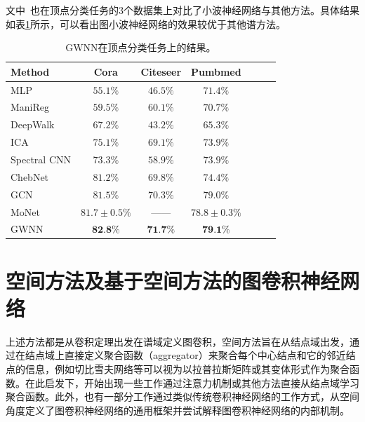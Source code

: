 \documentclass[final]{cvpr}
\begin{document}
文中~\cite{xu2018graph}也在顶点分类任务的3个数据集上对比了小波神经网络与其他方法。具体结果如表\ref{tab:GWNN-bench}所示，可以看出图小波神经网络的效果较优于其他谱方法。
\begin{table}[htb!]
    \centering
    \begin{tabular}{lcccccc} 
    \toprule
        \textbf{Method}  &  \textbf{Cora}   &  \textbf{Citeseer}  &   \textbf{Pumbmed} \\ 
    \midrule
        MLP & $55.1\%$   & $46.5\%$  & $71.4\%$ \\ 
        ManiReg & $59.5\%$   & $60.1\%$  & $70.7\%$ \\
        DeepWalk & $67.2\%$   & $43.2\%$  & $65.3\%$ \\
        ICA & $75.1\%$   & $69.1\%$  & $73.9\%$ \\
    \midrule
        Spectral CNN & $73.3\%$   & $58.9\%$  & $73.9\%$ \\ 
        ChebNet & $81.2\%$   & $69.8\%$  & $74.4\%$ \\ 
        GCN & $81.5\%$   & $70.3\%$  & $79.0\%$ \\ 
        MoNet & $81.7\pm 0.5 \%$   & $——$  & $78.8\pm 0.3 \%$ \\ 
    \midrule
        GWNN & $\textbf{82.8\%}$ & $\textbf{71.7\%}$ & $\textbf{79.1\%}$ \\
    \bottomrule
    \end{tabular}
    \caption{GWNN在顶点分类任务上的结果。}\label{tab:GWNN-bench}
\end{table}


\section{空间方法及基于空间方法的图卷积神经网络}

上述方法都是从卷积定理出发在谱域定义图卷积，空间方法旨在从结点域出发，通过在结点域上直接定义聚合函数（aggregator）来聚合每个中心结点和它的邻近结点的信息，例如切比雪夫网络等可以视为以拉普拉斯矩阵或其变体形式作为聚合函数。在此启发下，开始出现一些工作通过注意力机制或其他方法直接从结点域学习聚合函数。此外，也有一部分工作通过类似传统卷积神经网络的工作方式，从空间角度定义了图卷积神经网络的通用框架并尝试解释图卷积神经网络的内部机制。
\label{sec:SpatialMethod}
\end{document}
